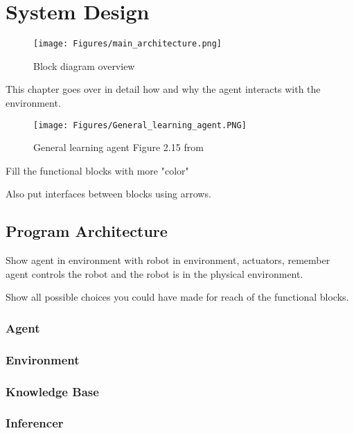 \chapter{System Design} 
\label{chapter:sys_design}

\begin{figure}[H]
    \centering
    \texttt{[image: Figures/main\_architecture.png]}
    \caption{Block diagram overview }
    \label{fig:sysdiag}
\end{figure}

This chapter goes over in detail how and why the agent interacts with the environment. 


\begin{figure}[H]
    \centering
    \texttt{[image: Figures/General\_learning\_agent.PNG]}
    \caption{General learning agent Figure 2.15 from \cite{russell2016artificial}} 
    \label{fig:agent}
\end{figure}

Fill the functional blocks with more "color"

Also put interfaces between blocks using arrows.

\section{Program Architecture}

Show agent in environment with robot in environment, actuators, remember agent controls the robot and the robot is in the physical environment.

Show all possible choices you could have made for reach of the functional blocks.

\subsection{Agent}
		
	
\subsection{Environment}



\subsection{Knowledge Base}



\subsection{Inferencer}

